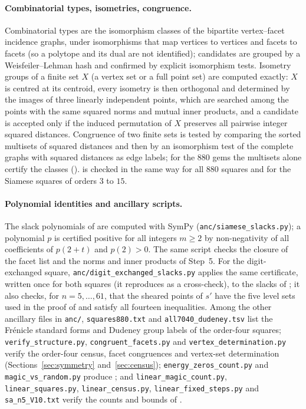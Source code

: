 \paragraph{Combinatorial types, isometries, congruence.}
Combinatorial types are the isomorphism classes of the bipartite vertex--facet incidence graphs, under isomorphisms that map vertices to vertices and facets to facets (so a polytope and its dual are not identified); candidates are grouped by a Weisfeiler--Lehman hash and confirmed by explicit isomorphism tests.
Isometry groups of a finite set $X$ (a vertex set or a full point set) are computed exactly: $X$ is centred at its centroid, every isometry is then orthogonal and determined by the images of three linearly independent points, which are searched among the points with the same squared norms and mutual inner products, and a candidate is accepted only if the induced permutation of $X$ preserves all pairwise integer squared distances.
Congruence of two finite sets is tested by comparing the sorted multisets of squared distances and then by an isomorphism test of the complete graphs with squared distances as edge labels; for the $880$ gems the multisets alone certify the classes ().
 is checked in the same way for all $880$ squares and for the Siamese squares of orders $3$ to $15$.

\paragraph{Polynomial identities and ancillary scripts.}
The slack polynomials of  are computed with SymPy (\texttt{anc/siamese\_slacks.py}); a polynomial $p$ is certified positive for all integers $m\ge2$ by non-negativity of all coefficients of $p(2+t)$ and $p(2)>0$.
The same script checks the closure of the facet list and the norms and inner products of Step~5.
For the digit-exchanged square, \texttt{anc/digit\_exchanged\_slacks.py} applies the same certificate, written once for both squares (it reproduces  as a cross-check), to the slacks of ; it also checks, for $n=5,\dots,61$, that the sheared points of $s'$ have the five level sets used in the proof of  and satisfy all fourteen inequalities.
Among the other ancillary files in \texttt{anc/}, \texttt{squares880.txt} and \texttt{all7040\_dudeney.tsv} list the Fr\'enicle standard forms and Dudeney group labels of the order-four squares; \texttt{verify\_structure.py}, \texttt{congruent\_facets.py} and \texttt{vertex\_determination.py} verify the order-four census, facet congruences and vertex-set determination (Sections~\ref{sec:symmetry} and~\ref{sec:census}); \texttt{energy\_zeros\_count.py} and \texttt{magic\_vs\_random.py} produce ; and \texttt{linear\_magic\_count.py}, \texttt{linear\_squares.py}, \texttt{linear\_census.py}, \texttt{linear\_fixed\_steps.py} and \texttt{sa\_n5\_V10.txt} verify the counts and bounds of .


